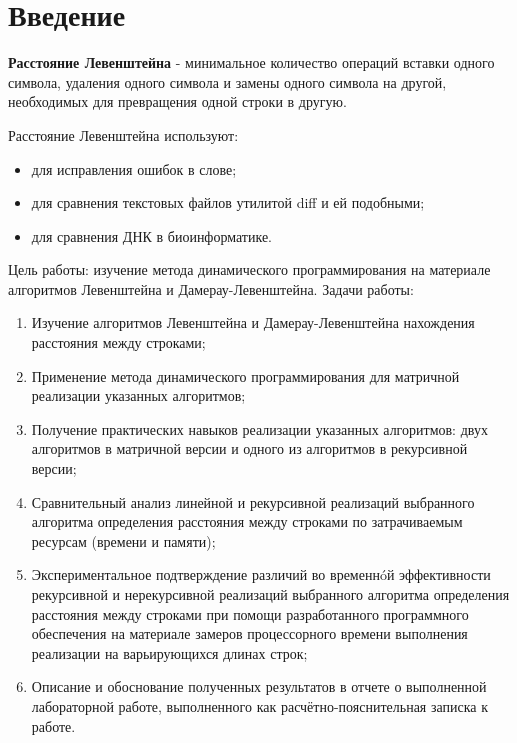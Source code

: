 \documentclass[a4paper,12pt]{report}
\begin{document}
        \section*{Введение}
        \begin{flushleft}
        \parindent=1cm
        \textbf{Расстояние Левенштейна} - минимальное количество операций вставки одного символа, удаления одного символа и замены одного символа на другой, необходимых для превращения одной строки в другую.
        
        Расстояние Левенштейна используют:
        \begin{itemize}
        	\item для исправления ошибок в слове;
			\item для сравнения текстовых файлов утилитой diff и ей подобными;
			\item для сравнения ДНК в биоинформатике.
		\end{itemize}

        Цель работы: изучение метода динамического программирования на материале алгоритмов	Левенштейна и Дамерау-Левенштейна.
		Задачи работы:\\
		\begin{enumerate}
			\item Изучение алгоритмов Левенштейна и Дамерау-Левенштейна нахождения расстояния между
		строками;

			\item Применение метода динамического программирования для матричной реализации указанных
		алгоритмов;

			\item Получение практических навыков реализации указанных алгоритмов: двух алгоритмов в
		матричной версии и одного из алгоритмов в рекурсивной версии;

			\item Сравнительный анализ линейной и рекурсивной реализаций выбранного алгоритма
		определения расстояния между строками по затрачиваемым ресурсам (времени и памяти);

			\item Экспериментальное подтверждение различий во временнóй эффективности рекурсивной и
		нерекурсивной реализаций выбранного алгоритма определения расстояния между строками при
		помощи разработанного программного обеспечения на материале замеров процессорного времени
		выполнения реализации на варьирующихся длинах строк;

			\item Описание и обоснование полученных результатов в отчете о выполненной лабораторной
		работе, выполненного как расчётно-пояснительная записка к работе.
		\end{enumerate}
        \end{flushleft}
\end{document}
